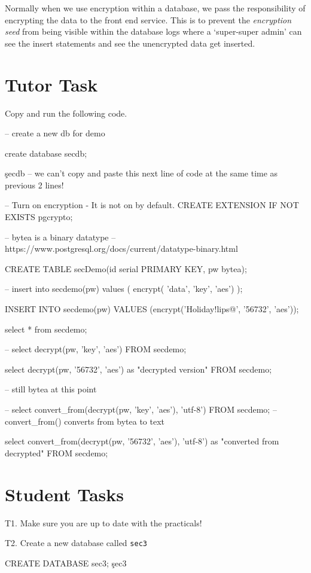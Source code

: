
Normally when we use encryption within a database, we pass the responsibility of encrypting the data to the front end service. This is to prevent the \textit{encryption seed} from being visible within the database logs where a `super-super admin' can see the insert statements and see the unencrypted data get inserted. 

\section*{Tutor Task}
Copy and run the following code.
\begin{sql}
-- create a new db for demo

create database secdb;

\c secdb
-- we can't copy and paste this next line of code at the same time as previous 2 lines!

-- Turn on encryption - It is not on by default.
CREATE EXTENSION IF NOT EXISTS pgcrypto;

-- bytea is a binary datatype
-- https://www.postgresql.org/docs/current/datatype-binary.html

CREATE TABLE secDemo(id serial PRIMARY KEY, pw bytea);

 -- insert into secdemo(pw) values ( encrypt( 'data', 'key', 'aes') );

INSERT INTO secdemo(pw)
VALUES (encrypt('Holiday!lips@', '56732', 'aes'));

select * from secdemo;

-- select decrypt(pw, 'key', 'aes') FROM secdemo;

select decrypt(pw, '56732', 'aes') as "decrypted version" FROM secdemo;

-- still bytea at this point

-- select convert_from(decrypt(pw, 'key', 'aes'), 'utf-8') FROM secdemo;
-- convert_from() converts from bytea to text

select convert_from(decrypt(pw, '56732', 'aes'), 'utf-8') as "converted from decrypted" FROM secdemo;
\end{sql}

\section*{Student Tasks}
T1. Make sure you are up to date with the practicals!

T2. Create a new database called \verb|sec3|
\begin{sql}
CREATE DATABASE sec3;
\c sec3
\end{sql}

